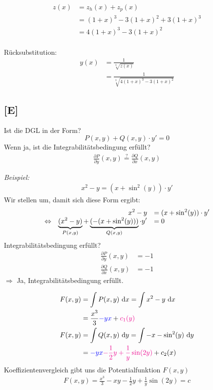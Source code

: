 \documentclass[main.tex]{subfiles}
\begin{document}
\begin{align*}
	z(x) &= z_h(x) + z_p(x) \\
		 &= (1+x)^3 -3(1+x)^2 + 3(1+x)^3 \\
		 &= 4(1+x)^3 -3(1+x)^2 \\
\end{align*}

Rücksubstitution:
\begin{align*}
	y(x) &= \frac{1}{\sqrt[3]{z(x)}} \\
		 &= \frac{1}{\sqrt[3]{4(1+x)^3 -3(1+x)^2}}
\end{align*}

\subsection{[E]}
Ist die DGL in der Form?
$$
	P(x,y) + Q(x,y)\cdot y' = 0
$$
Wenn ja, ist die Integrabilitätsbedingung erfüllt?
\begin{align*}
	\frac{\partial P}{\partial y} (x,y) \overset{?}{=} \frac{\partial Q}{\partial x}(x,y)
\end{align*}

\textit{Beispiel:}\\
\begin{align*}
	x^2 -y = (x + \sin^2(y))\cdot y'
\end{align*}
Wir stellen um, damit sich diese Form ergibt: 
\[\everymath={\displaystyle}\begin{array}{crl}
				& x^2 -y &= (x + \sin^2(y)) \cdot y' \\
\Leftrightarrow & \underbrace{(x^2 -y)}_{P(x,y)} + \underbrace{(-(x+\sin^2(y)))}_{Q(x,y)} \cdot y' & = 0 \\
\end{array}\]
Integrabilitätsbedingung erfüllt?
\begin{align*}
	\frac{\partial P}{\partial y}(x,y) &= -1 \\
	\frac{\partial Q}{\partial x}(x,y) &= -1 
\end{align*}
$\Rightarrow$ Ja, Integrabilitätsbedingung erfüllt.

\begin{align*}
	F(x,y) &= \int P(x,y) ~\mathrm{d}x = \int x^2 -y ~\mathrm{d}x \\
		&= \frac{x^3}{3} \textcolor{blue}{-y x} + \textcolor{magenta}{c_1(y)} \\
	F(x,y) &= \int Q(x,y) ~\mathrm{d}y = \int -x - \sin^2(y) ~\mathrm{d}y \\
		&= \textcolor{blue}{-y x} \textcolor{magenta}{-\frac{1}{2}y + \frac{1}{y} \sin(2 y)} + c_2(x)\\
\end{align*}
Koeffizientenvergleich gibt uns die Potentialfunktion $F(x,y)$
\begin{align*}
	F(x,y) = \frac{x^3}{3} -xy -\frac{1}{2}y + \frac{1}{y} \sin(2 y) = c
\end{align*}
\end{document}

